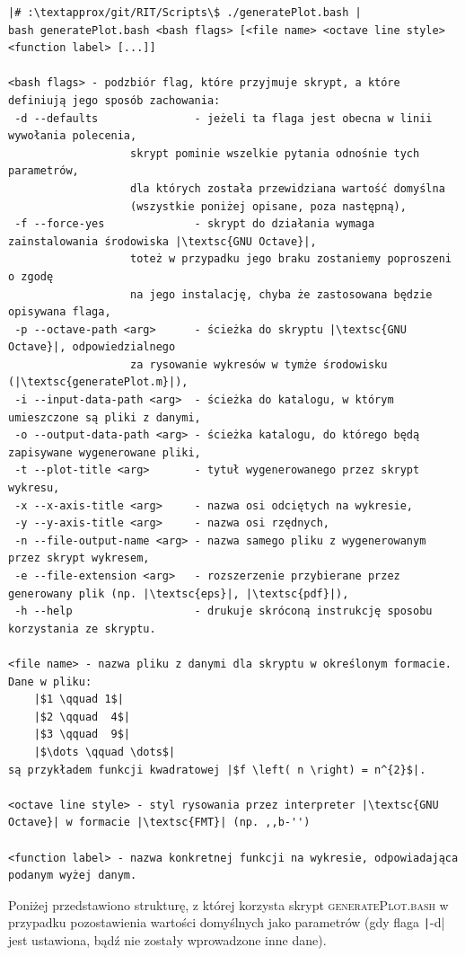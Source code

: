 \begin{verbatim}
|# :\textapprox/git/RIT/Scripts\$ ./generatePlot.bash |
bash generatePlot.bash <bash flags> [<file name> <octave line style> <function label> [...]]

<bash flags> - podzbiór flag, które przyjmuje skrypt, a które definiują jego sposób zachowania:
 -d --defaults               - jeżeli ta flaga jest obecna w linii wywołania polecenia, 
			       skrypt pominie wszelkie pytania odnośnie tych parametrów,
			       dla których została przewidziana wartość domyślna 
			       (wszystkie poniżej opisane, poza następną),
 -f --force-yes              - skrypt do działania wymaga zainstalowania środowiska |\textsc{GNU Octave}|, 
			       toteż w przypadku jego braku zostaniemy poproszeni o zgodę 
			       na jego instalację, chyba że zastosowana będzie opisywana flaga,
 -p --octave-path <arg>      - ścieżka do skryptu |\textsc{GNU Octave}|, odpowiedzialnego 
			       za rysowanie wykresów w tymże środowisku  (|\textsc{generatePlot.m}|),
 -i --input-data-path <arg>  - ścieżka do katalogu, w którym umieszczone są pliki z danymi,
 -o --output-data-path <arg> - ścieżka katalogu, do którego będą zapisywane wygenerowane pliki,
 -t --plot-title <arg>       - tytuł wygenerowanego przez skrypt wykresu,
 -x --x-axis-title <arg>     - nazwa osi odciętych na wykresie,
 -y --y-axis-title <arg>     - nazwa osi rzędnych,
 -n --file-output-name <arg> - nazwa samego pliku z wygenerowanym przez skrypt wykresem,
 -e --file-extension <arg>   - rozszerzenie przybierane przez generowany plik (np. |\textsc{eps}|, |\textsc{pdf}|),
 -h --help                   - drukuje skróconą instrukcję sposobu korzystania ze skryptu.

<file name> - nazwa pliku z danymi dla skryptu w określonym formacie. Dane w pliku:
	|$1	\qquad 1$|
	|$2 \qquad	4$|
	|$3 \qquad	9$|
	|$\dots \qquad \dots$|
są przykładem funkcji kwadratowej |$f \left( n \right) = n^{2}$|.

<octave line style> - styl rysowania przez interpreter |\textsc{GNU Octave}| w formacie |\textsc{FMT}| (np. ,,b-'')

<function label> - nazwa konkretnej funkcji na wykresie, odpowiadająca podanym wyżej danym.
\end{verbatim}

Poniżej przedstawiono strukturę, z której korzysta skrypt \textsc{generatePlot.bash} w przypadku pozostawienia wartości domyślnych jako parametrów (gdy flaga \texttt|-d| jest ustawiona, bądź nie zostały wprowadzone inne dane).

